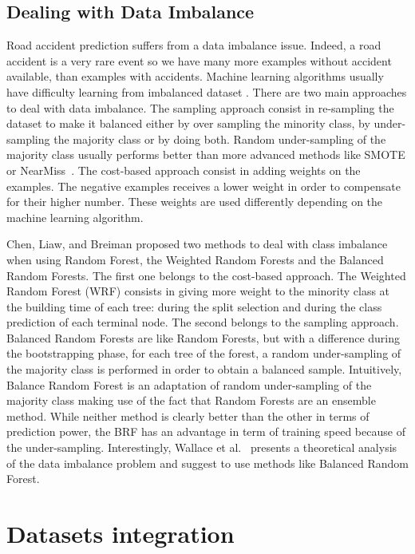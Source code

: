 \documentclass[conference]{IEEEtran}
\begin{document}
\subsection{Dealing with Data Imbalance}

Road accident prediction suffers from a data imbalance issue. Indeed, a road
accident is a very rare event so we have many more examples without accident
available, than examples with accidents. Machine learning algorithms usually
have difficulty learning from imbalanced dataset \cite{Branco2016}.
There are two main approaches to deal with data imbalance. The sampling approach
consist in re-sampling the dataset to make it balanced either by over sampling the
minority class, by under-sampling the majority class or by doing both.
Random under-sampling of the majority class usually performs better than
more advanced methods like SMOTE or NearMiss~\cite{Branco2016}.
The cost-based approach consist in adding weights on the examples. The
negative examples receives a lower weight in order to compensate for their
higher number. These weights are used differently depending on the machine
learning algorithm. 

Chen, Liaw, and Breiman\cite{Chen2004} proposed two methods to deal with class imbalance
when using Random Forest, the Weighted Random Forests and the Balanced Random Forests.
The first one belongs to the cost-based approach. The Weighted Random
Forest (WRF) consists in giving more weight to the minority class at
the building time of each tree: during the split selection and during the
class prediction of each terminal node. The second belongs to the sampling
approach. Balanced Random Forests are like Random Forests, but with a
difference during the bootstrapping phase, for each tree of the forest, a random under-sampling of the
majority class is performed in order to obtain a balanced sample. Intuitively,
Balance Random Forest is an adaptation of random under-sampling of the majority
class making use of the fact that Random Forests are an ensemble method.
While neither method is clearly better than the other in terms of prediction
power, the BRF has an advantage in term of training speed because of the under-sampling. Interestingly, Wallace et al.~\cite{Wallace2011} presents a theoretical analysis of the data
imbalance problem and suggest to use methods like Balanced Random Forest.

\section{Datasets integration}
\end{document}
